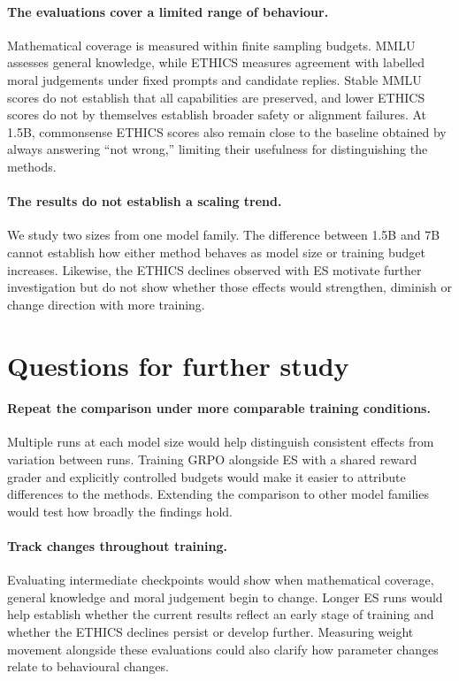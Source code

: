\documentclass[10pt]{article}
\begin{document}
\paragraph{The evaluations cover a limited range of behaviour.} Mathematical coverage is measured within finite sampling budgets. MMLU assesses general knowledge, while ETHICS measures agreement with labelled moral judgements under fixed prompts and candidate replies. Stable MMLU scores do not establish that all capabilities are preserved, and lower ETHICS scores do not by themselves establish broader safety or alignment failures. At 1.5B, commonsense ETHICS scores also remain close to the baseline obtained by always answering ``not wrong,'' limiting their usefulness for distinguishing the methods.

\paragraph{The results do not establish a scaling trend.} We study two sizes from one model family. The difference between 1.5B and 7B cannot establish how either method behaves as model size or training budget increases. Likewise, the ETHICS declines observed with ES motivate further investigation but do not show whether those effects would strengthen, diminish or change direction with more training.

\section{Questions for further study}\label{sec:future}
\paragraph{Repeat the comparison under more comparable training conditions.} Multiple runs at each model size would help distinguish consistent effects from variation between runs. Training GRPO alongside ES with a shared reward grader and explicitly controlled budgets would make it easier to attribute differences to the methods. Extending the comparison to other model families would test how broadly the findings hold.

\paragraph{Track changes throughout training.} Evaluating intermediate checkpoints would show when mathematical coverage, general knowledge and moral judgement begin to change. Longer ES runs would help establish whether the current results reflect an early stage of training and whether the ETHICS declines persist or develop further. Measuring weight movement alongside these evaluations could also clarify how parameter changes relate to behavioural changes.
\end{document}
